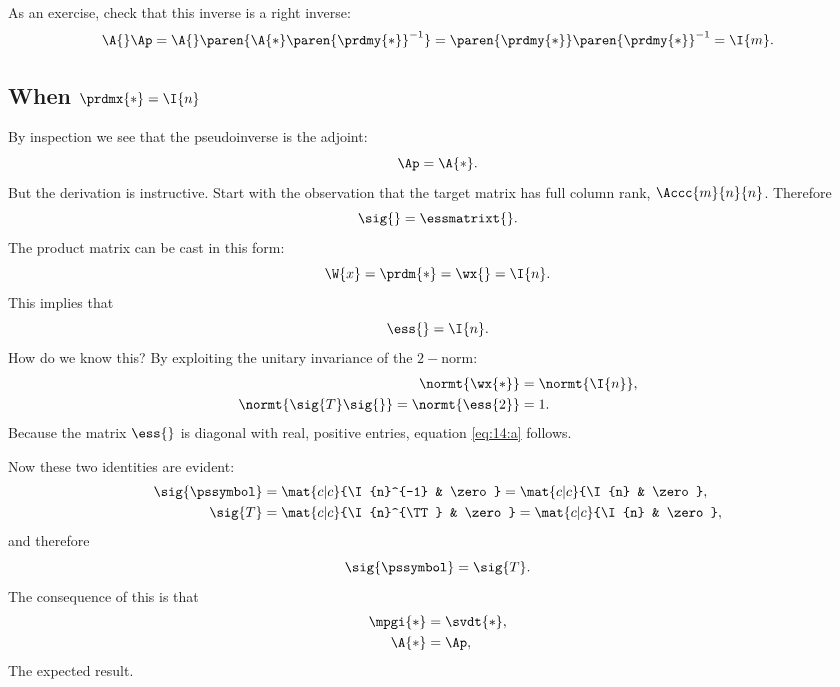 As an exercise, check that this inverse is a right inverse:
\begin{equation}
  \A{}\Ap = \A{}\paren{\A{*}\paren{\prdmy{*}}^{-1}} = \paren{\prdmy{*}}\paren{\prdmy{*}}^{-1} = \I{m}.
\end{equation}

\subsection{When $\prdmx{*}=\I{n}$}
By inspection we see that the pseudoinverse is the adjoint:
\begin{equation}
  \Ap = \A{*}.
\end{equation}
But the derivation is instructive. Start with the observation that the target matrix has full column rank, $\Accc{m}{n}{n}$. Therefore 
\begin{equation}
  \sig{} = \essmatrixt{}.
\end{equation}
The product matrix can be cast in this form:
\begin{equation}
  \W{x} = \prdm{*} = \wx{} = \I{n}.
\end{equation}
This implies that
\begin{equation}
  \ess{} = \I{n}.
  \label{eq:14:a}
\end{equation}
How do we know this? By exploiting the unitary invariance of the $2-$norm:
\begin{equation}
  \begin{split}
     \normt{\wx{*}} &= \normt{\I{n}}, \\
     \normt{\sig{T}\sig{}} = \normt{\ess{2}} &= 1.
  \end{split}
\end{equation}
Because the matrix $\ess{}$ is diagonal with real, positive entries, equation \eqref{eq:14:a} follows.

Now these two identities are evident:
\begin{equation}
  \begin{split}
     \sig{\pssymbol} &= \mat{c|c}{\I{n}^{-1} & \zero}  = \mat{c|c}{\I{n} & \zero}, \\
     \sig{T}         &= \mat{c|c}{\I{n}^{\TT} & \zero} = \mat{c|c}{\I{n} & \zero},
  \end{split}
\end{equation}
and therefore
\begin{equation}
  \sig{\pssymbol} = \sig{T}.
\end{equation}
The consequence of this is that
\begin{equation}
  \begin{split}
     \mpgi{*} &= \svdt{*}, \\
     \A{*}  &= \Ap,
  \end{split}
\end{equation}
The expected result.
	
\endinput
